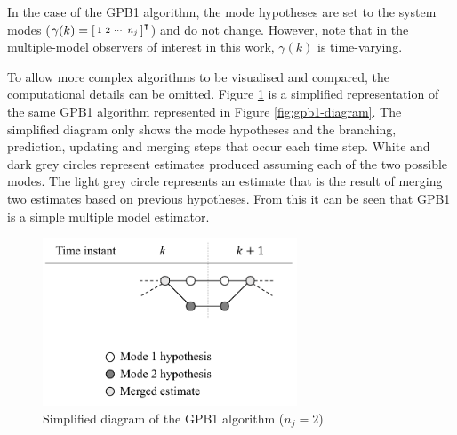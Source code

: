 In the case of the GPB1 algorithm, the mode hypotheses are set to the system modes ($\gamma(k)=\begin{bsmallmatrix} 1 & 2 & \cdots & n_j \end{bsmallmatrix}^\intercal$) and do not change. However, note that in the multiple-model observers of interest in this work, $\gamma(k)$ is time-varying. 

To allow more complex algorithms to be visualised and compared, the computational details can be omitted. Figure \ref{fig:mm-obs-gpb1} is a simplified representation of the same GPB1 algorithm represented in Figure \ref{fig:gpb1-diagram}. The simplified diagram only shows the mode hypotheses and the branching, prediction, updating and merging steps that occur each time step. White and dark grey circles represent estimates produced assuming each of the two possible modes. The light grey circle represents an estimate that is the result of merging two estimates based on previous hypotheses. From this it can be seen that GPB1 is a simple multiple model estimator.

\begin{figure}[htp]
	\centering
	\includegraphics[height=5cm]{images/mm_obs_seq_gpb1.pdf}
	\caption{Simplified diagram of the GPB1 algorithm ($n_j=2$)}
	\label{fig:mm-obs-gpb1}
\end{figure}

